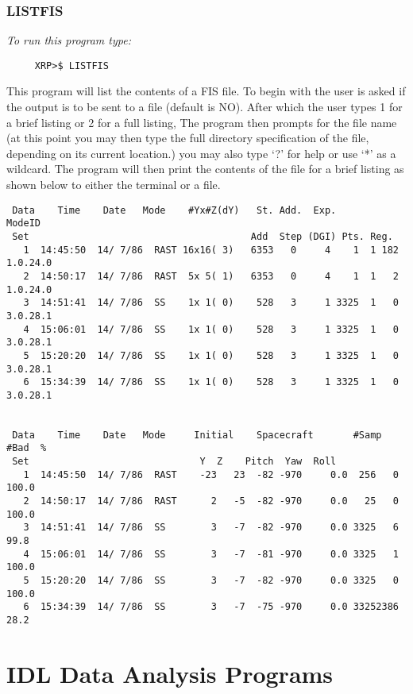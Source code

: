 \subsubsection{LISTFIS}

{\em To run this program type:}
\begin{verbatim}
     XRP>$ LISTFIS
\end{verbatim}
  This program will list the contents of a FIS file. To begin with the user is asked if
  the output is to be sent to a file (default is NO). After which the user types
  1 for a brief listing or 2 for a full listing, The program then prompts for
  the file name (at this point you may then type the full directory specification of
  the file, depending on its current location.) you may also type `?' for help or
  use `*' as a wildcard. The program will then print the contents of the file
  for a brief listing as shown below to either the terminal or a file.
\begin{verbatim}
 Data    Time    Date   Mode    #Yx#Z(dY)   St. Add.  Exp.         ModeID
 Set                                       Add  Step (DGI) Pts. Reg.
   1  14:45:50  14/ 7/86  RAST 16x16( 3)   6353   0     4    1  1 182 1.0.24.0
   2  14:50:17  14/ 7/86  RAST  5x 5( 1)   6353   0     4    1  1   2 1.0.24.0
   3  14:51:41  14/ 7/86  SS    1x 1( 0)    528   3     1 3325  1   0 3.0.28.1
   4  15:06:01  14/ 7/86  SS    1x 1( 0)    528   3     1 3325  1   0 3.0.28.1
   5  15:20:20  14/ 7/86  SS    1x 1( 0)    528   3     1 3325  1   0 3.0.28.1
   6  15:34:39  14/ 7/86  SS    1x 1( 0)    528   3     1 3325  1   0 3.0.28.1


 Data    Time    Date   Mode     Initial    Spacecraft       #Samp #Bad  %
 Set                              Y  Z    Pitch  Yaw  Roll
   1  14:45:50  14/ 7/86  RAST    -23   23  -82 -970     0.0  256   0 100.0
   2  14:50:17  14/ 7/86  RAST      2   -5  -82 -970     0.0   25   0 100.0
   3  14:51:41  14/ 7/86  SS        3   -7  -82 -970     0.0 3325   6  99.8
   4  15:06:01  14/ 7/86  SS        3   -7  -81 -970     0.0 3325   1 100.0
   5  15:20:20  14/ 7/86  SS        3   -7  -82 -970     0.0 3325   0 100.0
   6  15:34:39  14/ 7/86  SS        3   -7  -75 -970     0.0 33252386  28.2
\end{verbatim}

\newpage

\section{IDL Data Analysis Programs}

